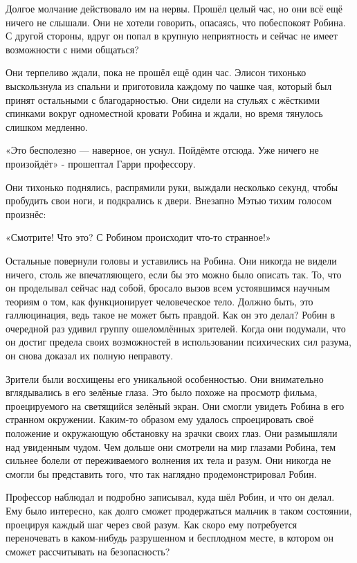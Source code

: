 \documentclass[a4paper,12pt]{book}
\begin{document}
\par
Долгое молчание действовало им на нервы. Прошёл целый час, но они всё ещё ничего не слышали. Они не хотели говорить, опасаясь, что побеспокоят Робина. С другой стороны, вдруг он попал в крупную неприятность и сейчас не имеет возможности с ними общаться?
\par
Они терпеливо ждали, пока не прошёл ещё один час. Элисон тихонько выскользнула из спальни и приготовила каждому по чашке чая, который был принят остальными с благодарностью. Они сидели на стульях с жёсткими спинками вокруг одноместной кровати Робина и ждали, но время тянулось слишком медленно.
\par
«Это бесполезно — наверное, он уснул. Пойдёмте отсюда. Уже ничего не произойдёт» - прошептал Гарри профессору.
\par
Они тихонько поднялись, распрямили руки, выждали несколько секунд, чтобы пробудить свои ноги, и подкрались к двери. Внезапно Мэтью тихим голосом произнёс:
\par
«Смотрите! Что это? С Робином происходит что-то странное!»
\par
Остальные повернули головы и уставились на Робина. Они никогда не видели ничего, столь же впечатляющего, если бы это можно было описать так. То, что он проделывал сейчас над собой, бросало вызов всем устоявшимся научным теориям о том, как функционирует человеческое тело. Должно быть, это галлюцинация, ведь такое не может быть правдой. Как он это делал? Робин в очередной раз удивил группу ошеломлённых зрителей. Когда они подумали, что он достиг предела своих возможностей в использовании психических сил разума, он снова доказал их полную неправоту.\\
\par
Зрители были восхищены его уникальной особенностью. Они внимательно вглядывались в его зелёные глаза. Это было похоже на просмотр фильма, проецируемого на светящийся зелёный экран. Они смогли увидеть Робина в его странном окружении. Каким-то образом ему удалось спроецировать своё положение и окружающую обстановку на зрачки своих глаз. Они размышляли над увиденным чудом. Чем дольше они смотрели на мир глазами Робина, тем сильнее болели от переживаемого волнения их тела и разум. Они никогда не смогли бы представить того, что так наглядно продемонстрировал Робин.\\
\par
Профессор наблюдал и подробно записывал, куда шёл Робин, и что он делал. Ему было интересно, как долго сможет продержаться мальчик в таком состоянии, проецируя каждый шаг через свой разум. Как скоро ему потребуется переночевать в каком-нибудь разрушенном и бесплодном месте, в котором он сможет рассчитывать на безопасность?
\end{document}
